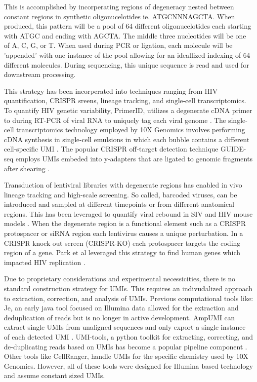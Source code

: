 \documentclass[9pt,twocolumn,twoside]{extarticle}
\begin{document}
This is accomplished by incorperating regions of degeneracy nested between constant regions in synthetic oligonucelotides ie. ATGCNNNAGCTA.
When produced, this pattern will be a pool of 64 different oligonucelotides each starting with ATGC and ending with AGCTA.
The middle three nucleotides will be one of A, C, G, or T.
When used during PCR or ligation, each molecule will be 'appended' with one instance of the pool allowing for an ideallized indexing of 64 different molecules.
During sequencing, this unique sequence is read and used for downstream processing.

This strategy has been incorperated into techniques ranging from HIV quantification, CRISPR sreens, lineage tracking, and single-cell transcriptomics.
To quantify HIV genetic variability, PrimerID, utilizes a degenerate cDNA primer to during RT-PCR of viral RNA to uniquely tag each viral genome \cite{jabara2011primerid, zhou2015primerid}.
The single-cell transcriptomics technology employed by 10X Genomics involves performing cDNA synthesis in single-cell emulsions in which each bubble contains a different cell-specific UMI \cite{zheng2017massively}.
The popular CRISPR off-target detection technique GUIDE-seq employs UMIs embeded into y-adapters that are ligated to genomic fragments after shearing \cite{liang2022guidetag}.

Transduction of lentiviral libraries with degenerate regions has enabled in vivo lineage tracking and high-scale screening.
So called, barcoded viruses, can be introduced and sampled at different timepoints or from different anatomical regions.
This has been leveraged to quantify viral rebound in SIV and HIV mouse models \cite{fennessey2017genetically, keele2024early, marsden2020tracking}.
When the degenerate region is a functional element such as a CRISPR protospacer or siRNA region each lentivirus causes a unique perturbation. 
In a CRISPR knock out screen (CRISPR-KO) each protospacer targets the coding region of a gene.
Park et al leveraged this strategy to find human genes which impacted HIV replication \cite{park2017genome}. 

Due to proprietary considerations and experimental necessicities, there is no standard construction strategy for UMIs.
This requires an indivudalized approach to extraction, correction, and analysis of UMIs.
Previous computational tools like:
Je, an early java tool focused on Illumina data allowed for the extraction and deduplication of reads \cite{girardot2016je} but is no longer in active development.
AmpUMI can extract single UMIs from unaligned sequences and only export a single instance of each detected UMI \cite{clement2018ampumi}.
UMI-tools, a python toolkit for extracting, correcting, and de-duplicating reads based on UMIs has become a popular pipeline component \cite{smith2017umitools}.
Other tools like CellRanger, handle UMIs for the specific chemistry used by 10X Genomics.
However, all of these tools were designed for Illumina based technology and assume constant sized UMIs.
\end{document}
